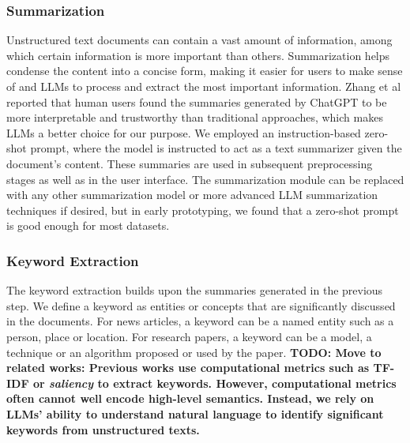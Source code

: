 \subsubsection{Summarization}\label{sec: summarization}
Unstructured text documents can contain a vast amount of information, among which certain information is more important than others.
Summarization helps condense the content into a concise form, making it easier for users to make sense of and LLMs to process and extract the most important information. 
Zhang et al\cite{zhang2023extractive} reported that human users found the summaries generated by ChatGPT to be more interpretable and trustworthy than traditional approaches, which makes LLMs a better choice for our purpose.
We employed an instruction-based zero-shot prompt, where the model is instructed to act as a text summarizer given the document's content.
These summaries are used in subsequent preprocessing stages as well as in the user interface.
The summarization module can be replaced with any other summarization model or more advanced LLM summarization techniques if desired, but in early prototyping, we found that a zero-shot prompt is good enough for most datasets.

\subsubsection{Keyword Extraction}\label{sec: keyword_extraction}
The keyword extraction builds upon the summaries generated in the previous step.
We define a keyword as entities or concepts that are significantly discussed in the documents.
For news articles, a keyword can be a named entity such as a person, place or location.
For research papers, a keyword can be a model, a technique or an algorithm proposed or used by the paper.
\textbf{TODO: Move to related works: 
Previous works use computational metrics such as TF-IDF or \textit{saliency} to extract keywords.
However, computational metrics often cannot well encode high-level semantics.
Instead, we rely on LLMs' ability to understand natural language to identify significant keywords from unstructured texts.
}

